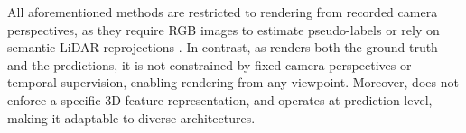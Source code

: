 All aforementioned methods are restricted to rendering from recorded camera perspectives, as they require RGB images to estimate pseudo-labels \citep{huang2024selfocc,gan2024gaussianocc,jiang2024gausstr} or rely on semantic LiDAR reprojections \citep{pan2024renderocc,sun2024gsrender}.
{In contrast, as \method{} renders both the ground truth and the predictions, it is not constrained by fixed camera perspectives or temporal supervision, enabling rendering from any viewpoint.}
Moreover, \method{} does not enforce a specific 3D feature representation, {and operates at prediction-level}, making it adaptable to diverse architectures.








